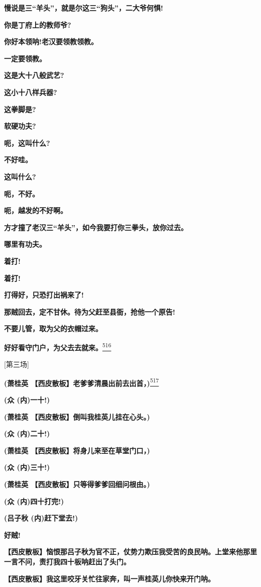 \textbf{慢说是三``羊头''，就是尔这三``狗头''，二大爷何惧!}

\textbf{你是丁府上的教师爷?}

\textbf{你好本领呐!老汉要领教领教。}

\textbf{一定要领教。}

\textbf{这是大十八般武艺?}

\textbf{这小十八样兵器?}

\textbf{这拳脚是?}

\textbf{软硬功夫?}

\textbf{呃，这叫什么?}

\textbf{不好哇。}

\textbf{这叫什么?}

\textbf{呃，不好。}

\textbf{呃，越发的不好啊。}

\textbf{方才撞了老汉三``羊头''，如今我要打你三拳头，放你过去。}

\textbf{哪里有功夫。}

\textbf{着打!}

\textbf{着打!}

\textbf{打得好，只恐打出祸来了!}

\textbf{那贼回去，定不甘休。待为父赶至县衙，抢他一个原告!}

\textbf{不要儿管，取为父的衣帽过来。}

\textbf{好好看守门户，为父去去就来。}\protect\hyperlink{fn516}{\textsuperscript{516}}

{[}第三场{]}

\textbf{(萧桂英
【西皮散板】老爹爹清晨出前去出首，)}\protect\hyperlink{fn517}{\textsuperscript{517}}

\textbf{(众 (内)一十!)}

\textbf{(萧桂英 【西皮散板】倒叫我桂英儿挂在心头。)}

\textbf{(众 (内)二十!)}

\textbf{(萧桂英 【西皮散板】将身儿来至在草堂门口，)}

\textbf{(众 (内)三十!)}

\textbf{(萧桂英 【西皮散板】只等得爹爹回细问根由。)}

\textbf{(众 (内)四十打完!)}

\textbf{(吕子秋 (内)赶下堂去!)}

\textbf{好贼!}

\textbf{【西皮散板】恼恨那吕子秋为官不正，仗势力欺压我受苦的良民呐。上堂来他那里一言不问，责打我四十板呐赶出了头门。}

\textbf{【西皮散板】我这里咬牙关忙往家奔，叫一声桂英儿你快来开门呐。}

